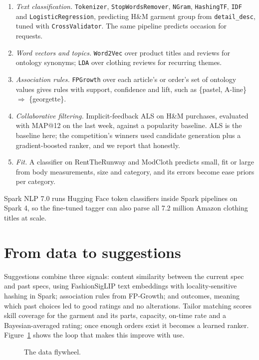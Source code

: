 \begin{enumerate}
\item \emph{Text classification.} \texttt{Tokenizer}, \texttt{StopWordsRemover}, \texttt{NGram}, \texttt{HashingTF}, \texttt{IDF} and \texttt{LogisticRegression}, predicting H\&M garment group from \texttt{detail\_desc}, tuned with \texttt{CrossValidator}. The same pipeline predicts occasion for requests.
\item \emph{Word vectors and topics.} \texttt{Word2Vec} over product titles and reviews for ontology synonyms; \texttt{LDA} over clothing reviews for recurring themes.
\item \emph{Association rules.} \texttt{FPGrowth} over each article's or order's set of ontology values gives rules with support, confidence and lift, such as \{pastel, A-line\} $\Rightarrow$ \{georgette\}.
\item \emph{Collaborative filtering.} Implicit-feedback ALS \cite{hu2008implicit} on H\&M purchases, evaluated with MAP@12 on the last week, against a popularity baseline. ALS is the baseline here; the competition's winners used candidate generation plus a gradient-boosted ranker, and we report that honestly.
\item \emph{Fit.} A classifier on RentTheRunway and ModCloth predicts small, fit or large from body measurements, size and category, and its errors become ease priors per category.
\end{enumerate}

Spark NLP 7.0 runs Hugging Face token classifiers inside Spark pipelines on Spark 4, so the fine-tuned \sys{} tagger can also parse all 7.2 million Amazon clothing titles at scale.

\section{From data to suggestions}

Suggestions combine three signals: content similarity between the current spec and past specs, using FashionSigLIP text embeddings with locality-sensitive hashing in Spark; association rules from FP-Growth; and outcomes, meaning which past choices led to good ratings and no alterations. Tailor matching scores skill coverage for the garment and its parts, capacity, on-time rate and a Bayesian-averaged rating; once enough orders exist it becomes a learned ranker. Figure~\ref{fig:fly} shows the loop that makes this improve with use.

\begin{figure}[h]
\centering
\caption{The data flywheel.}\label{fig:fly}
\end{figure}

